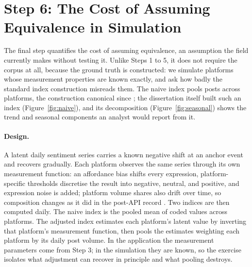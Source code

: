 
\section{Step 6: The Cost of Assuming Equivalence in Simulation}
\label{sec:cost}

The final step quantifies the cost of assuming equivalence, an assumption the field currently makes without testing it. Unlike Steps 1 to 5, it does not require the corpus at all, because the ground truth is constructed: we simulate platforms whose measurement properties are known exactly, and ask how badly the standard index construction misreads them. The naive index pools posts across platforms, the construction canonical since \citet{oconnor2010}; the dissertation itself built such an index (Figure~\ref{fig:naive}), and its decomposition (Figure~\ref{fig:seasonal}) shows the trend and seasonal components an analyst would report from it.

\paragraph{Design.}
A latent daily sentiment series carries a known negative shift at an anchor event and recovers gradually. Each platform observes the same series through its own measurement function: an affordance bias shifts every expression, platform-specific thresholds discretise the result into negative, neutral, and positive, and expression noise is added; platform volume shares also drift over time, so composition changes as it did in the post-API record \citep{davidson2023, goanta2026}. Two indices are then computed daily. The naive index is the pooled mean of coded values across platforms. The adjusted index estimates each platform's latent value by inverting that platform's measurement function, then pools the estimates weighting each platform by its daily post volume. In the application the measurement parameters come from Step 3; in the simulation they are known, so the exercise isolates what adjustment can recover in principle and what pooling destroys.

